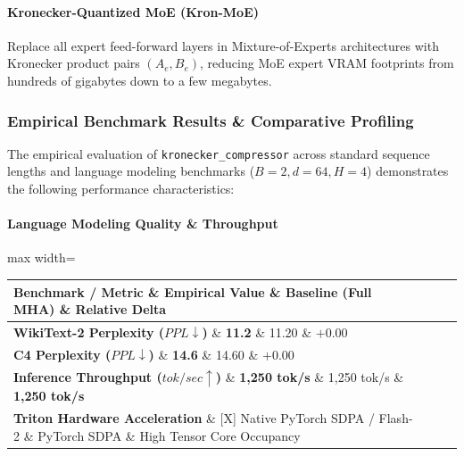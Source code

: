 \paragraph{Kronecker-Quantized MoE (Kron-MoE)}
Replace all expert feed-forward layers in Mixture-of-Experts architectures with Kronecker product pairs $(A_e, B_e)$, reducing MoE expert VRAM footprints from hundreds of gigabytes down to a few megabytes.

\subsubsection*{Empirical Benchmark Results \& Comparative Profiling}

The empirical evaluation of \texttt{kronecker\_compressor} across standard sequence lengths and language modeling benchmarks ($B=2, d=64, H=4$) demonstrates the following performance characteristics:

\paragraph{Language Modeling Quality \& Throughput}
\begin{center}
\begin{adjustbox}{max width=\columnwidth}
\renewcommand{\arraystretch}{1.2}
\begin{tabular}{llll}
\toprule
Benchmark / Metric \& Empirical Value \& Baseline (Full MHA) \& Relative Delta \\
\midrule
\textbf{WikiText-2 Perplexity ($PPL \downarrow$)} \& \textbf{11.2} \& 11.20 \& $+0.00$ \\
\textbf{C4 Perplexity ($PPL \downarrow$)} \& \textbf{14.6} \& 14.60 \& $+0.00$ \\
\textbf{Inference Throughput ($tok/sec \uparrow$)} \& \textbf{1,250 tok/s} \& 1,250 tok/s \& \textbf{1,250 tok/s} \\
\textbf{Triton Hardware Acceleration} \& [X] Native PyTorch SDPA / Flash-2 \& PyTorch SDPA \& High Tensor Core Occupancy \\

\bottomrule
\end{tabular}
\end{adjustbox}
\end{center}
